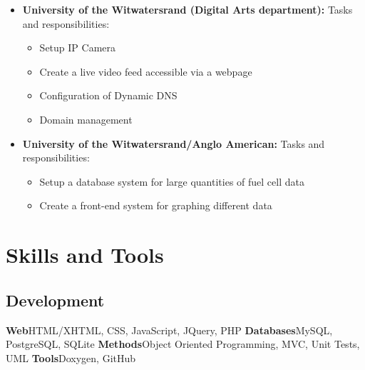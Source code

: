 \documentclass[11pt,a4paper,nolmodern]{moderncv}
\begin{document}
{\begin{itemize}
\begin{itemize}
    \item Produce application notes detailing time delay curves, Cascading, Selective co-ordination and various types of circuit breakers
  \end{itemize}
  \item \textbf{University of the Witwatersrand (Digital Arts department):} \newline Tasks and responsibilities:
  \begin{itemize}
    \item Setup IP Camera
    \item Create a live video feed accessible via a webpage
    \item Configuration of Dynamic DNS
    \item Domain management
  \end{itemize}
  \item \textbf{University of the Witwatersrand/Anglo American:} \newline Tasks and responsibilities:
  \begin{itemize}
    \item Setup a database system for large quantities of fuel cell data
    \item Create a front-end system for graphing different data
  \end{itemize}
\end{itemize}
}


\section{Skills and Tools}


\subsection{Development}

           {\textbf{Web}}{HTML/XHTML, CSS, JavaScript, JQuery, PHP}
           {\textbf{Databases}}{MySQL, PostgreSQL, SQLite}
           {\textbf{Methods}}{Object Oriented Programming, MVC, Unit Tests, UML}
           {\textbf{Tools}}{Doxygen, GitHub}
\end{document}
